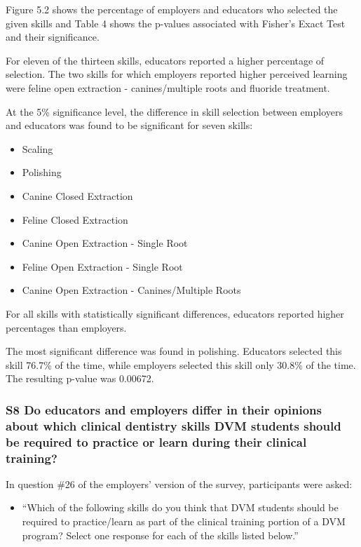 \documentclass[
  11pt,
  letterpaper,
  DIV=11,
  numbers=noendperiod]{scrartcl}
\providecommand{\tightlist}{%
  \setlength{\itemsep}{0pt}\setlength{\parskip}{0pt}}\usepackage{longtable,booktabs,array}
\numberwithin{figure}{section}
\begin{document}
Figure 5.2 shows the percentage of employers and educators who selected
the given skills and Table 4 shows the p-values associated with Fisher's
Exact Test and their significance.

For eleven of the thirteen skills, educators reported a higher
percentage of selection. The two skills for which employers reported
higher perceived learning were feline open extraction - canines/multiple
roots and fluoride treatment.

At the 5\% significance level, the difference in skill selection between
employers and educators was found to be significant for seven skills:

\begin{itemize}
\tightlist
\item
  Scaling
\item
  Polishing
\item
  Canine Closed Extraction
\item
  Feline Closed Extraction
\item
  Canine Open Extraction - Single Root
\item
  Feline Open Extraction - Single Root
\item
  Canine Open Extraction - Canines/Multiple Roots
\end{itemize}

For all skills with statistically significant differences, educators
reported higher percentages than employers.

The most significant difference was found in polishing. Educators
selected this skill 76.7\% of the time, while employers selected this
skill only 30.8\% of the time. The resulting p-value was 0.00672.

\subsubsection{S8 Do educators and employers differ in their opinions
about which clinical dentistry skills DVM students should be required to
practice or learn during their clinical
training?}\label{s8-do-educators-and-employers-differ-in-their-opinions-about-which-clinical-dentistry-skills-dvm-students-should-be-required-to-practice-or-learn-during-their-clinical-training}

In question \#26 of the employers' version of the survey, participants
were asked:

\begin{itemize}
\tightlist
\item
  ``Which of the following skills do you think that DVM students should
  be required to practice/learn as part of the clinical training portion
  of a DVM program? Select one response for each of the skills listed
  below.''
\end{itemize}
\end{document}
